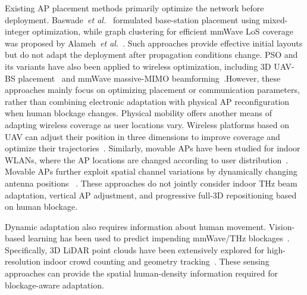 \documentclass[conference]{IEEEtran}
\begin{document}
	Existing AP placement methods primarily optimize the network before
	deployment. Baswade~\textit{et al.}~\cite{b4} formulated base-station
	placement using mixed-integer optimization, while graph clustering for efficient mmWave LoS
	coverage was proposed by Alameh~\textit{et
		al.}~\cite{b7}. Such approaches provide effective initial layouts but do
	not adapt the deployment after propagation conditions change. PSO and
	its variants have also been applied to wireless optimization,
	including 3D UAV-BS placement~\cite{b15} and mmWave massive-MIMO
	beamforming~\cite{b16}.However, these approaches mainly focus on optimizing placement or communication parameters, rather than combining electronic adaptation with physical AP reconfiguration when human blockage changes.
	Physical mobility offers another means of adapting wireless coverage as user locations vary. Wireless platforms based on UAV can adjust their position in three dimensions to improve coverage and optimize their trajectories~\cite{b15,b20}. Similarly, movable APs have been studied for indoor WLANs, where the AP locations are changed according to user distribution~\cite{b21}. Movable APs further exploit spatial channel variations by dynamically changing antenna positions
	~\cite{b22}. These approaches do not jointly consider
	indoor THz beam adaptation, vertical AP adjustment, and progressive
	full-3D repositioning based on human blockage.
	
	Dynamic adaptation also requires information about human
	movement. Vision-based learning has been used to predict impending
	mmWave/THz blockages~\cite{b25}.
	Specifically, 3D LiDAR point clouds have been extensively explored for high-resolution indoor crowd counting and geometry tracking~\cite{b27,b29}. These sensing approaches can provide the spatial
	human-density information required for blockage-aware adaptation.
	
	
	
	
	
\end{document}
